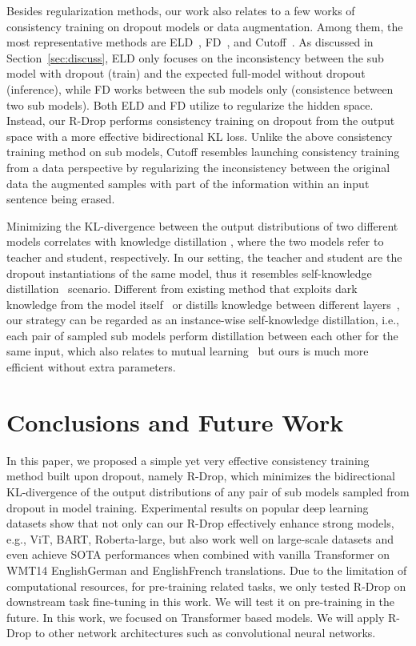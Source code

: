 \documentclass{article}
\begin{document}
Besides regularization methods, our work also relates to a few works of consistency training on dropout models or data augmentation.
Among them, the most representative methods are ELD~\citep{ma2016dropout}, FD~\citep{zolna2017fraternal}, and Cutoff~\citep{shen2020simple}.
As discussed in Section~\ref{sec:discuss}, ELD only focuses on the inconsistency between the sub model with dropout (train) and the expected full-model without dropout (inference), while FD works between the sub models only (consistence between two sub models).
Both ELD and FD utilize  to regularize the hidden space.
Instead, our R-Drop performs consistency training on dropout from the output space with a more effective bidirectional KL loss.
Unlike the above consistency training method on sub models, Cutoff resembles launching consistency training from a data perspective by regularizing the inconsistency between the original data the augmented samples with part of the information within an input sentence being erased.


Minimizing the KL-divergence between the output distributions of two different models correlates with knowledge distillation \cite{hinton2015distilling,furlanello2018born,allen2020towards,liang2021mixkd,fang2021seed,zhou2021rethinking}, where the two models refer to teacher and student, respectively.
In our setting, the teacher and student are the dropout instantiations of the same model, thus it resembles self-knowledge distillation~\cite{mobahi2020self} scenario.
Different from existing method that exploits dark knowledge from the model itself~\cite{hahn2019self,gotmare2018closer} or distills knowledge between different layers~\cite{zhang2019your}, our strategy can be regarded as an instance-wise self-knowledge distillation, i.e., each pair of sampled sub models perform distillation between each other for the same input, which also relates to mutual learning~\cite{zhang2018deep} but ours is much more efficient without extra parameters. 



\section{Conclusions and Future Work}

In this paper, we proposed a simple yet very effective consistency training method built upon dropout, namely R-Drop, which minimizes the bidirectional KL-divergence of the output distributions of any pair of sub models sampled from dropout in model training. Experimental results on  popular deep learning datasets show that not only can our R-Drop effectively enhance strong models, e.g., ViT, BART, Roberta-large, but also work well on large-scale datasets and even achieve SOTA performances when combined with vanilla Transformer on WMT14 EnglishGerman and EnglishFrench translations.
Due to the limitation of computational resources, for pre-training related tasks, we only tested R-Drop on downstream task fine-tuning in this work. We will test it on pre-training in the future. In this work, we focused on Transformer based models. We will apply R-Drop to other network architectures such as convolutional neural networks.  
\end{document}
